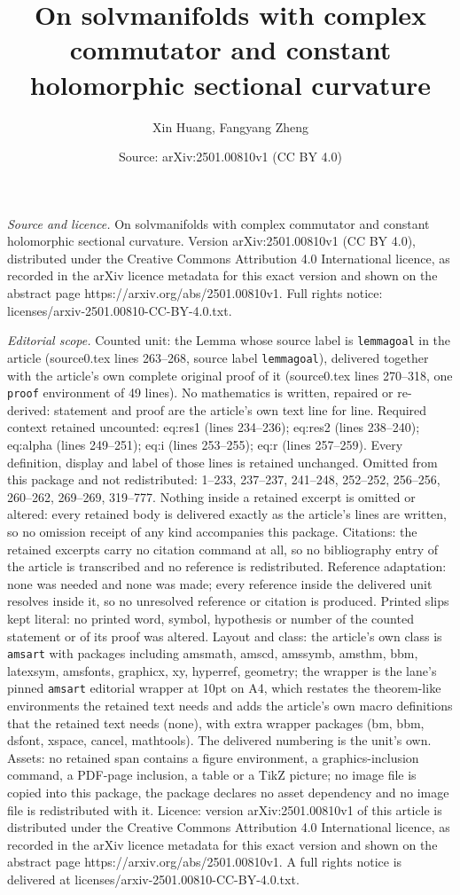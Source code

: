 \documentclass[10pt,a4paper]{amsart}
\title[On solvmanifolds with complex commutator and constant holomo]{On solvmanifolds with complex commutator and constant holomorphic sectional curvature}
\author{Xin Huang, Fangyang Zheng}
\date{Source: arXiv:2501.00810v1 (CC BY 4.0)}
\begin{document}
\maketitle

\noindent\emph{Source and licence.} On solvmanifolds with complex commutator and constant holomorphic sectional curvature. Version arXiv:2501.00810v1 (CC BY 4.0), distributed under the Creative Commons Attribution 4.0 International licence, as recorded in the arXiv licence metadata for this exact version and shown on the abstract page https://arxiv.org/abs/2501.00810v1. Full rights notice: licenses/arxiv-2501.00810-CC-BY-4.0.txt.\par\smallskip

\noindent\textit{Editorial scope.} Counted unit: the Lemma whose source label is \texttt{lemmagoal} in the article (source0.tex lines 263--268, source label \texttt{lemmagoal}), delivered together with the article's own complete original proof of it (source0.tex lines 270--318, one \texttt{proof} environment of 49 lines). No mathematics is written, repaired or re-derived: statement and proof are the article's own text line for line. Required context retained uncounted: eq:res1 (lines 234--236); eq:res2 (lines 238--240); eq:alpha (lines 249--251); eq:i (lines 253--255); eq:r (lines 257--259). Every definition, display and label of those lines is retained unchanged. Omitted from this package and not redistributed: 1--233, 237--237, 241--248, 252--252, 256--256, 260--262, 269--269, 319--777. Nothing inside a retained excerpt is omitted or altered: every retained body is delivered exactly as the article's lines are written, so no omission receipt of any kind accompanies this package. Citations: the retained excerpts carry no citation command at all, so no bibliography entry of the article is transcribed and no reference is redistributed. Reference adaptation: none was needed and none was made; every reference inside the delivered unit resolves inside it, so no unresolved reference or citation is produced. Printed slips kept literal: no printed word, symbol, hypothesis or number of the counted statement or of its proof was altered. Layout and class: the article's own class is \texttt{amsart} with packages including amsmath, amscd, amssymb, amsthm, bbm, latexsym, amsfonts, graphicx, xy, hyperref, geometry; the wrapper is the lane's pinned \texttt{amsart} editorial wrapper at 10pt on A4, which restates the theorem-like environments the retained text needs and adds the article's own macro definitions that the retained text needs (none), with extra wrapper packages (bm, bbm, dsfont, xspace, cancel, mathtools). The delivered numbering is the unit's own. Assets: no retained span contains a figure environment, a graphics-inclusion command, a PDF-page inclusion, a table or a TikZ picture; no image file is copied into this package, the package declares no asset dependency and no image file is redistributed with it. Licence: version arXiv:2501.00810v1 of this article is distributed under the Creative Commons Attribution 4.0 International licence, as recorded in the arXiv licence metadata for this exact version and shown on the abstract page https://arxiv.org/abs/2501.00810v1. A full rights notice is delivered at licenses/arxiv-2501.00810-CC-BY-4.0.txt. 
\end{document}
